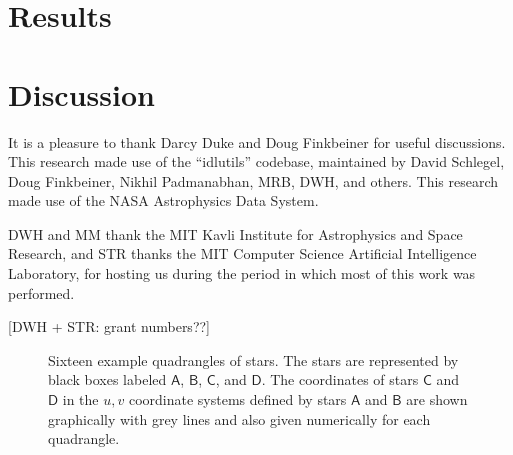 \documentclass[12pt,preprint]{aastex}
\newcommand{\starlabel}[1]{\mathsf{#1}}
\newcommand{\AAA}{\starlabel{A}}
\newcommand{\BBB}{\starlabel{B}}
\newcommand{\CCC}{\starlabel{C}}
\newcommand{\DDD}{\starlabel{D}}
\begin{document}
\section{Results}

\section{Discussion}

\acknowledgements
It is a pleasure to thank Darcy Duke and Doug Finkbeiner for useful
discussions.  This research made use of the ``idlutils'' codebase,
maintained by David Schlegel, Doug Finkbeiner, Nikhil Padmanabhan,
MRB, DWH, and others.  This research made use of the NASA Astrophysics
Data System.

DWH and MM thank the MIT Kavli Institute for Astrophysics and Space
Research, and STR thanks the MIT Computer Science Artificial
Intelligence Laboratory, for hosting us during the period in which
most of this work was performed.

[DWH + STR: grant numbers??]




\clearpage
\begin{figure}
\caption{Sixteen example quadrangles of stars.  The stars are
  represented by black boxes labeled $\AAA$, $\BBB$, $\CCC$, and
  $\DDD$.  The coordinates of stars $\CCC$ and $\DDD$ in the $u,v$
  coordinate systems defined by stars $\AAA$ and $\BBB$ are shown
  graphically with grey lines and also given numerically for each
  quadrangle.\label{fig:quad}}
\end{figure}
\end{document}
